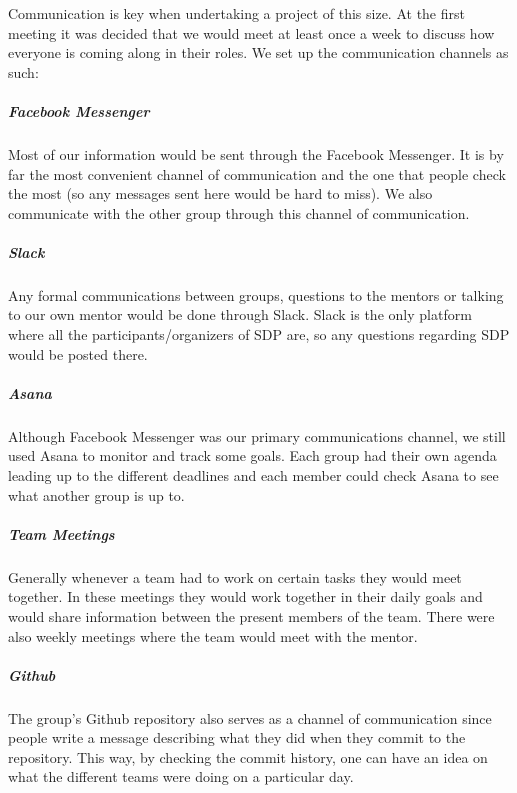 Communication is key when undertaking a project of this size. At the first meeting it was decided that we would meet at least once a week to discuss how everyone is coming along in their roles. We set up the communication channels as such:

\subparagraph{Facebook Messenger}
Most of our information would be sent through the Facebook Messenger. It is by far the most convenient channel of communication and the one that people check the most (so any messages sent here would be hard to miss). We also communicate with the other group through this channel of communication.
\subparagraph{Slack}
Any formal communications between groups, questions to the mentors or talking to our own mentor would be done through Slack. Slack is the only platform where all the participants/organizers of SDP are, so any questions regarding SDP would be posted there.
\subparagraph{Asana}
Although Facebook Messenger was our primary communications channel, we still used Asana to monitor and track some goals. Each group had their own agenda leading up to the different deadlines and each member could check Asana to see what another group is up to.
\subparagraph{Team Meetings}
Generally whenever a team had to work on certain tasks they would meet together. In these meetings they would work together in their daily goals and would share information between the present members of the team. There were also weekly meetings where the team would meet with the mentor.
\subparagraph{Github}
The group's Github repository also serves as a channel of communication since people write a message describing what they did when they commit to the repository. This way, by checking the commit history, one can have an idea on what the different teams were doing on a particular day.